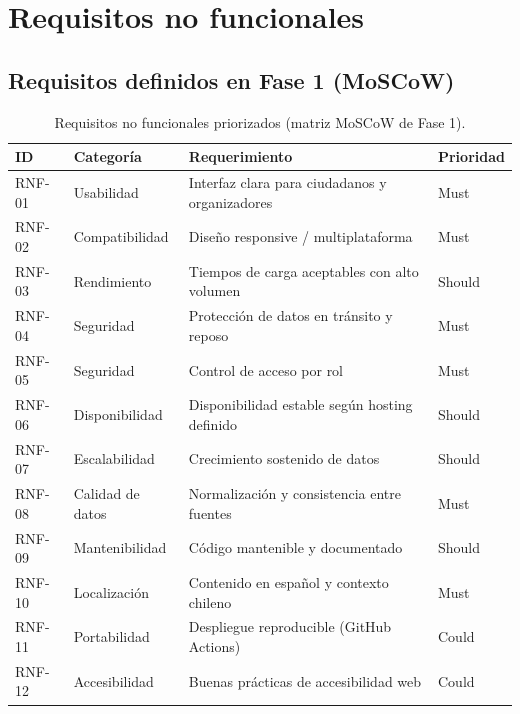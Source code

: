 
\section{Requisitos no funcionales}
\label{sec:rnf}

\subsection{Requisitos definidos en Fase 1 (MoSCoW)}

\begin{table}[ht]
\centering\small
\renewcommand{\arraystretch}{1.2}
\begin{tabular}{l l p{6.8cm} l}
\toprule
\textbf{ID} & \textbf{Categoría} & \textbf{Requerimiento} & \textbf{Prioridad} \\
\midrule
RNF-01 & Usabilidad & Interfaz clara para ciudadanos y organizadores & Must \\
RNF-02 & Compatibilidad & Diseño responsive / multiplataforma & Must \\
RNF-03 & Rendimiento & Tiempos de carga aceptables con alto volumen & Should \\
RNF-04 & Seguridad & Protección de datos en tránsito y reposo & Must \\
RNF-05 & Seguridad & Control de acceso por rol & Must \\
RNF-06 & Disponibilidad & Disponibilidad estable según hosting definido & Should \\
RNF-07 & Escalabilidad & Crecimiento sostenido de datos & Should \\
RNF-08 & Calidad de datos & Normalización y consistencia entre fuentes & Must \\
RNF-09 & Mantenibilidad & Código mantenible y documentado & Should \\
RNF-10 & Localización & Contenido en español y contexto chileno & Must \\
RNF-11 & Portabilidad & Despliegue reproducible (GitHub Actions) & Could \\
RNF-12 & Accesibilidad & Buenas prácticas de accesibilidad web & Could \\
\bottomrule
\end{tabular}
\caption{Requisitos no funcionales priorizados (matriz MoSCoW de Fase 1).}
\label{tab:rnf}
\end{table}

